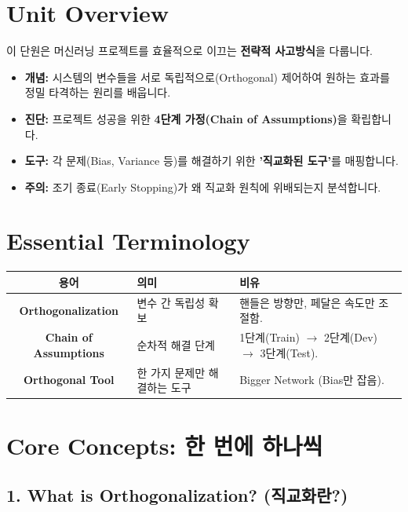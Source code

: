 \documentclass[11pt,a4paper]{book}
\theoremstyle{definition}
\begin{document}
\section{Unit Overview}
\begin{summarybox}[title={핵심 목표}]
이 단원은 머신러닝 프로젝트를 효율적으로 이끄는 \textbf{전략적 사고방식}을 다룹니다.
\begin{itemize}
    \item \textbf{개념:} 시스템의 변수들을 서로 독립적으로(Orthogonal) 제어하여 원하는 효과를 정밀 타격하는 원리를 배웁니다.
    \item \textbf{진단:} 프로젝트 성공을 위한 \textbf{4단계 가정(Chain of Assumptions)}을 확립합니다.
    \item \textbf{도구:} 각 문제(Bias, Variance 등)를 해결하기 위한 \textbf{'직교화된 도구'}를 매핑합니다.
    \item \textbf{주의:} 조기 종료(Early Stopping)가 왜 직교화 원칙에 위배되는지 분석합니다.
\end{itemize}
\end{summarybox}

\section{Essential Terminology}
\begin{center}
\begin{tabular}{|c|l|l|}
\hline
\textbf{용어} & \textbf{의미} & \textbf{비유} \\ \hline
\textbf{Orthogonalization} & 변수 간 독립성 확보 & 핸들은 방향만, 페달은 속도만 조절함. \\ \hline
\textbf{Chain of Assumptions} & 순차적 해결 단계 & 1단계(Train) $\to$ 2단계(Dev) $\to$ 3단계(Test). \\ \hline
\textbf{Orthogonal Tool} & 한 가지 문제만 해결하는 도구 & Bigger Network (Bias만 잡음). \\ \hline
\end{tabular}
\end{center}

\section{Core Concepts: 한 번에 하나씩}

\subsection{1. What is Orthogonalization? (직교화란?)}
\end{document}
